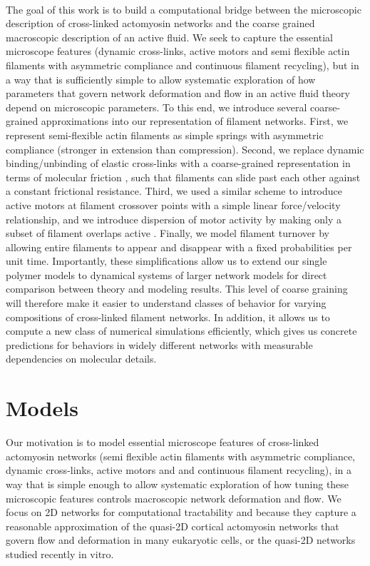 \paragraph{}  The goal of this work is to build a computational bridge between the microscopic description of cross-linked actomyosin networks and the coarse grained macroscopic description of an active fluid.  We seek to capture the essential microscope features (dynamic cross-links, active motors and semi flexible actin filaments with asymmetric compliance and continuous filament recycling), but in a way that is sufficiently simple to allow systematic exploration of how parameters that govern network deformation and flow in an active fluid theory depend on microscopic parameters. To this end, we introduce several coarse-grained approximations into our representation of filament networks. First, we represent semi-flexible actin filaments as simple springs with asymmetric compliance (stronger in extension than compression). Second, we replace  dynamic binding/unbinding of elastic cross-links with a coarse-grained representation in terms of molecular friction \cite{theo_friction,theo_frictionSam,theo_molefric}, such that filaments can slide past each other against a constant frictional resistance. Third, we used a similar scheme to introduce active motors at filament crossover points with a simple linear force/velocity relationship, and we introduce dispersion of motor activity by making only a subset of filament overlaps active \cite{theo_frictionShila}.  Finally, we model filament turnover by allowing entire filaments to appear and disappear with a fixed probabilities per unit time. Importantly, these simplifications allow us to extend our single polymer models to dynamical systems of larger network models for direct comparison between theory and modeling results. This level of coarse graining will therefore make it easier to understand classes of behavior for varying compositions of cross-linked filament networks. In addition, it allows us to compute a new class of numerical simulations efficiently, which gives us concrete predictions for behaviors in widely different networks with measurable dependencies on molecular details. 



\section{Models}


Our motivation is to model essential microscope features of cross-linked actomyosin networks (semi flexible actin filaments with asymmetric compliance, dynamic cross-links, active motors and and continuous filament recycling), in a way that is simple enough to allow systematic exploration of how tuning these microscopic features controls macroscopic network deformation and flow. We focus on 2D networks for computational tractability and because they capture a reasonable approximation of the quasi-2D cortical actomyosin networks that govern flow and deformation in many eukaryotic cells\cite{cellmech_flows, salbreuxbphs}, or the quasi-2D networks studied recently in vitro\cite{rheo_2D1,rheo_2D2}.

